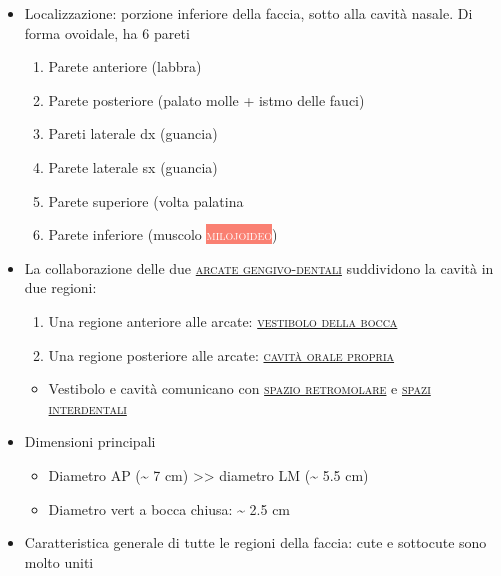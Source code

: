 \documentclass[italian,]{article}
\providecommand{\tightlist}{%
  \setlength{\itemsep}{0pt}\setlength{\parskip}{0pt}}
\newcommand{\mus}[1]{\colorbox{Salmon}{\textcolor{white}{\textsc{#1}}}}
\renewcommand{\a}[1]{\underline{\textsc{#1}}}
\begin{document}
\begin{itemize}
\tightlist
\item
  Localizzazione: porzione inferiore della faccia, sotto alla cavità
  nasale. Di forma ovoidale, ha 6 pareti

  \begin{enumerate}
  \def\labelenumi{\arabic{enumi}.}
  \tightlist
  \item
    Parete anteriore (labbra)
  \item
    Parete posteriore (palato molle + istmo delle fauci)
  \item
    Pareti laterale dx (guancia)
  \item
    Parete laterale sx (guancia)
  \item
    Parete superiore (volta palatina
  \item
    Parete inferiore (muscolo \mus{milojoideo})
  \end{enumerate}
\item
  La collaborazione delle due \a{arcate gengivo-dentali} suddividono la
  cavità in due regioni:

  \begin{enumerate}
  \def\labelenumi{\arabic{enumi}.}
  \tightlist
  \item
    Una regione anteriore alle arcate: \a{vestibolo della bocca}
  \item
    Una regione posteriore alle arcate: \a{cavità orale propria}
  \end{enumerate}

  \begin{itemize}
  \tightlist
  \item
    Vestibolo e cavità comunicano con \a{spazio retromolare} e
    \a{spazi interdentali}
  \end{itemize}
\item
  Dimensioni principali

  \begin{itemize}
  \tightlist
  \item
    Diametro AP (\textasciitilde{} 7 cm) \textgreater{}\textgreater{}
    diametro LM (\textasciitilde{} 5.5 cm)
  \item
    Diametro vert a bocca chiusa: \textasciitilde{} 2.5 cm
  \end{itemize}
\item
  Caratteristica generale di tutte le regioni della faccia: cute e
  sottocute sono molto uniti


\end{itemize}
\end{document}
